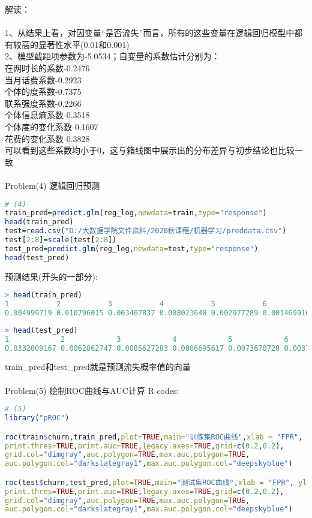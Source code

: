\documentclass[]{article}
\begin{document}
解读：\\\\
1、从结果上看，对因变量“是否流失”而言，所有的这些变量在逻辑回归模型中都有较高的显著性水平(0.01和0.001)\\
2、模型截距项参数为-5.0534；自变量的系数估计分别为：\\
在网时长的系数-0.2476\\
当月话费系数-0.2923\\
个体的度系数-0.7375\\
联系强度系数-0.2266\\
个体信息熵系数-0.3518\\
个体度的变化系数-0.1607\\
花费的变化系数-0.3828\\
可以看到这些系数均小于0，这与箱线图中展示出的分布差异与初步结论也比较一致\\\\
Problem(4) 逻辑回归预测
\begin{lstlisting}[language=R]
# (4)
train_pred=predict.glm(reg_log,newdata=train,type="response")
head(train_pred)
test=read.csv("D:/大数据学院文件资料/2020秋课程/机器学习/preddata.csv")
test[2:8]=scale(test[2:8])
test_pred=predict.glm(reg_log,newdata=test,type="response")
head(test_pred)
\end{lstlisting}
预测结果(开头的一部分):
\begin{lstlisting}[language=R]
> head(train_pred)
1           2           3           4           5           6 
0.004999719 0.010796015 0.003467837 0.008023648 0.002977289 0.001469916 
\end{lstlisting}
\begin{lstlisting}[language=R]
> head(test_pred)
1            2            3            4            5            6 
0.0332009167 0.0062862747 0.0085627283 0.0006695617 0.0073670728 0.0037128759 
\end{lstlisting}
train\_pred和test\_pred就是预测流失概率值的向量\\\\
Problem(5) 绘制ROC曲线与AUC计算
R codes:
\begin{lstlisting}[language=R]
# (5)
library("pROC")

roc(train$churn,train_pred,plot=TRUE,main="训练集ROC曲线",xlab = "FPR", ylab = "TPR",
print.thres=TRUE,print.auc=TRUE,legacy.axes=TRUE,grid=c(0.2,0.2),
grid.col="dimgray",auc.polygon=TRUE,max.auc.polygon=TRUE,
auc.polygon.col="darkslategray1",max.auc.polygon.col="deepskyblue")

roc(test$churn,test_pred,plot=TRUE,main="测试集ROC曲线",xlab = "FPR", ylab = "TPR",
print.thres=TRUE,print.auc=TRUE,legacy.axes=TRUE,grid=c(0.2,0.2),
grid.col="dimgray",auc.polygon=TRUE,max.auc.polygon=TRUE,
auc.polygon.col="darkslategray1",max.auc.polygon.col="deepskyblue")
\end{lstlisting}
\end{document}
